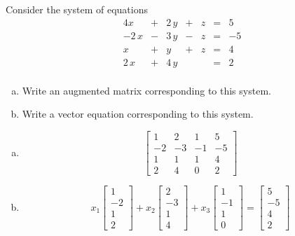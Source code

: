 
\begin{exerciseStatement}


 Consider the system of equations 
\begin{alignat*}{4} x &+& 2 \, y &+& z &=& 5 \\-2 \, x &-& 3 \, y &-& z &=& -5 \\x &+& y &+& z &=& 4 \\2 \, x &+& 4 \, y & &  &=& 2 \\ \end{alignat*}
            


\begin{enumerate}[(a)]
\item  Write an augmented matrix corresponding to this system. 
\item  Write a vector equation corresponding to this system. 
\end{enumerate}
    
\end{exerciseStatement}
    
\begin{exerciseAnswer} 

\begin{enumerate}[(a)]
\item \[ \left[\begin{array}{ccc|c}
1 & 2 & 1 & 5 \\
-2 & -3 & -1 & -5 \\
1 & 1 & 1 & 4 \\
2 & 4 & 0 & 2
\end{array}\right] \]
\item \[ x_{1} \left[\begin{array}{c}
1 \\
-2 \\
1 \\
2
\end{array}\right] + x_{2} \left[\begin{array}{c}
2 \\
-3 \\
1 \\
4
\end{array}\right] + x_{3} \left[\begin{array}{c}
1 \\
-1 \\
1 \\
0
\end{array}\right] = \left[\begin{array}{c}
5 \\
-5 \\
4 \\
2
\end{array}\right] \]
\end{enumerate}
    
\end{exerciseAnswer}
    
